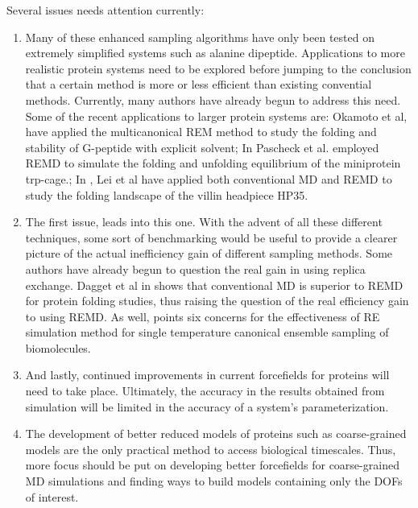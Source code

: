\documentclass[12pt]{article}
\numberwithin{equation}{subsection}
\begin{document}
\begin{spacing}{1}
Several issues needs attention currently:
\begin{enumerate}
\item Many of these enhanced sampling algorithms have only been tested on extremely simplified systems such as alanine dipeptide. Applications to more realistic protein systems need to be explored before jumping to the conclusion that a certain method is more or less efficient than existing convential methods. Currently, many authors have already begun to address this need. Some of the recent applications to larger protein systems are: \cite{oka_app}
 Okamoto et al, have applied the multicanonical REM method to study the folding and stability of G-peptide with explicit solvent; In \cite{trpcage} Pascheck et al. employed REMD to simulate the folding and unfolding equilibrium of the miniprotein trp-cage.; In \cite{villin}, Lei et al have applied both conventional MD and REMD to study the folding landscape of the villin headpiece HP35.
\item The first issue, leads into this one. With the advent of all these different techniques, some sort of benchmarking would be useful to provide a clearer picture of the actual inefficiency gain of different sampling methods. Some authors have already begun to question the real gain in using replica exchange. Dagget et al in \cite{dagget} shows that conventional MD is superior to REMD for protein folding studies, thus raising the question of the real efficiency gain to using REMD. As well, \cite{zucker06} points six concerns for the effectiveness of RE simulation method for single temperature canonical ensemble sampling of biomolecules.
\item And lastly, continued improvements in current forcefields for proteins will need to take place. Ultimately, the accuracy in the results obtained from simulation will be limited in the accuracy of a system's parameterization. 
\item The development of better reduced models of proteins such as coarse-grained models are the only practical method to access biological timescales. Thus, more focus should be put on developing better forcefields for coarse-grained MD simulations and finding ways to build models containing only the DOFs of interest.
\end{enumerate}


\end{spacing}
\end{document}
